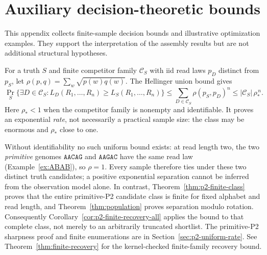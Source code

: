 \section{Auxiliary decision-theoretic bounds}
\label{app:decision-bounds}

This appendix collects finite-sample decision bounds and illustrative
optimization examples. They support the interpretation of the assembly
results but are not additional structural hypotheses.

\begin{remark}
\label{rem:sample-complexity}
For a truth $S$ and finite competitor family $\mathcal C_S$ with iid
read laws $p_D$ distinct from $p_S$, let
$\rho(p,q)=\sum_w\sqrt{p(w)q(w)}$. The Hellinger union bound gives
\[
 \Pr_S\{\exists D\in\mathcal C_S:L_D(R_1,\ldots,R_n)
                                  \ge L_S(R_1,\ldots,R_n)\}
 \le \sum_{D\in\mathcal C_S}\rho(p_S,p_D)^n
 \le |\mathcal C_S|\,\rho_*^{\,n}.
\]
Here $\rho_*<1$ when the competitor family is nonempty and identifiable.
It proves an exponential \emph{rate}, not necessarily a practical sample
size: the class may be enormous and $\rho_*$ close to one.

Without identifiability no such uniform bound exists: at read
length two, the two \emph{primitive} genomes
$\texttt{AACAG}$ and $\texttt{AAGAC}$ have the same
read law (Example~\ref{ex:ABAB}), so $\rho=1$.
Every sample therefore ties under these two distinct
truth candidates; a positive exponential separation
cannot be inferred from the observation model alone.
In contrast, Theorem~\ref{thm:p2-finite-class} proves that the entire
primitive-P2 candidate class is finite for fixed alphabet and read length,
and Theorem~\ref{thm:population} proves separation modulo rotation.
Consequently Corollary~\ref{cor:p2-finite-recovery-all} applies the bound
to that complete class, not merely to an arbitrarily truncated shortlist.
The primitive-P2 sharpness proof and finite enumerations
are in Section~\ref{sec:p2-uniform-rate}. See
Theorem~\ref{thm:finite-recovery} for the kernel-checked
finite-family recovery bound.
\end{remark}

